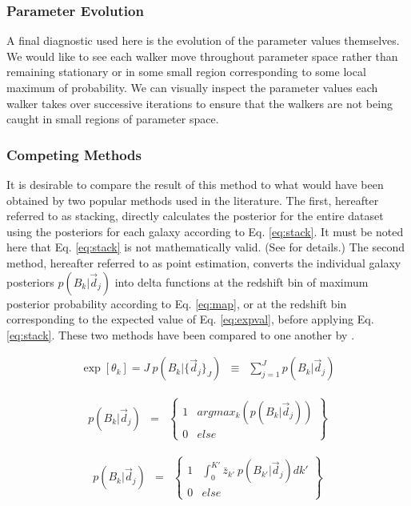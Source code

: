 \documentclass[preprint]{aastex}
\begin{document}
\clearpage
\subsubsection{Parameter Evolution}
\label{sec:params}

A final diagnostic used here is the evolution of the parameter values themselves.  We would like to see each walker move throughout parameter space rather than remaining stationary or in some small region corresponding to some local maximum of probability.  We can visually inspect the parameter values each walker takes over successive iterations to ensure that the walkers are not being caught in small regions of parameter space.

\clearpage
\subsubsection{Competing Methods}
\label{sec:sheldon}

It is desirable to compare the result of this method to what would have been obtained by two popular methods used in the literature.   The first, hereafter referred to as stacking, directly calculates the posterior for the entire dataset using the posteriors for each galaxy according to Eq. \ref{eq:stack}.  \citep{lim08}  It must be noted here that Eq. \ref{eq:stack} is not mathematically valid.  (See \citet{hog12} for details.)  The second method, hereafter referred to as point estimation, converts the individual galaxy posteriors $p(B_{k}|\vec{d}_{j})$ into delta functions at the redshift bin of maximum posterior probability according to Eq. \ref{eq:map}, or at the redshift bin corresponding to the expected value of Eq. \ref{eq:expval}, before applying Eq. \ref{eq:stack}.  These two methods have been compared to one another by \citet{hil11, ben12}.

\begin{eqnarray}
\label{eq:stack}
\exp[\theta_{k}] = J\ p(B_{k}|\{\vec{d}_{j}\}_{J}) &\equiv& \sum_{j=1}^{J}p(B_{k}|\vec{d}_{j})
\end{eqnarray}

\begin{eqnarray}
\label{eq:map}
p(B_{k}|\vec{d}_{j}) &=& \left\{\begin{array}{cc}1&argmax_{k}(p(B_{k}|\vec{d}_{j}))\\0&else\end{array}\right\}
\end{eqnarray}

\begin{eqnarray}
\label{eq:expval}
p(B_{k}|\vec{d}_{j}) &=& \left\{\begin{array}{cc}1&\int_{0}^{K'} \bar{z}_{k'}\ p(B_{k'}|\vec{d}_{j}) dk'\\0&else\end{array}\right\}
\end{eqnarray}
\end{document}
